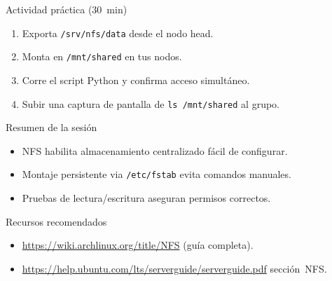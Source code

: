 \documentclass[aspectratio=169,professionalfonts]{beamer}
\begin{document}
\begin{frame}[fragile]{Actividad práctica (30 min)}
  \begin{enumerate}
    \item Exporta \texttt{/srv/nfs/data} desde el nodo head.
    \item Monta en \texttt{/mnt/shared} en tus nodos.
    \item Corre el script Python y confirma acceso simultáneo.
    \item Subir una captura de pantalla de \texttt{ls /mnt/shared} al grupo.
  \end{enumerate}
\end{frame}

\begin{frame}[fragile]{Resumen de la sesión}
  \begin{itemize}
    \item NFS habilita almacenamiento centralizado fácil de configurar.
    \item Montaje persistente via \texttt{/etc/fstab} evita comandos manuales.
    \item Pruebas de lectura/escritura aseguran permisos correctos.
  \end{itemize}
\end{frame}

\begin{frame}[fragile]{Recursos recomendados}
  \begin{itemize}
    \item \url{https://wiki.archlinux.org/title/NFS} (guía completa).
    \item \url{https://help.ubuntu.com/lts/serverguide/serverguide.pdf} sección NFS.
  \end{itemize}
\end{frame}
\end{document}
